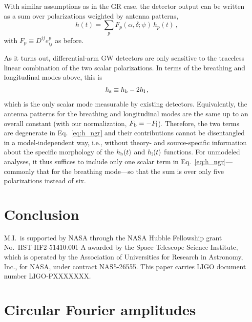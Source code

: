 \documentclass[aps,prd,twocolumn,superscriptaddress,preprintnumbers,floatfix,nofootinbib]{revtex4-2}
\newcommand{\beq}{\begin{equation}}
\newcommand{\eeq}{\end{equation}}
\newcommand{\dcc}{LIGO-PXXXXXXX}
\begin{document}
With similar assumptions as in the GR case, the detector output can be written as a sum over polarizations weighted by antenna patterns,
\beq \label{eq:h_ngr}
h(t) = \sum_p F_p(\alpha, \delta; \psi)\, h_p(t)\, ,
\eeq
with $F_p \equiv D^{ij} e^p_{ij}$ as before. 

As it turns out, differential-arm GW detectors are only sensitive to the traceless linear combination of the two scalar polarizations.
In terms of the breathing and longitudinal modes above, this is
\beq
h_{\rm s} \equiv \hb - 2\hlon\, ,
\eeq
which is the only scalar mode measurable by existing detectors.
Equivalently, the antenna patterns for the breathing and longitudinal modes are the same up to an overall constant (with our normalization, $F_{{\rm b}} = -F_{{\rm l}}$).
Therefore, the two terms are degenerate in Eq.~\eqref{eq:h_ngr} and their contributions cannot be disentangled in a model-independent way, i.e., without theory- and source-specific information about the specific morphology of the $h_{{\rm b}}(t)$ and $h_{{\rm l}}(t)$ functions.
For unmodeled analyses, it thus suffices to include only one scalar term in Eq.~\eqref{eq:h_ngr}---commonly that for the breathing mode---so that the sum is over only five polarizations instead of six.

\section{Conclusion}

\begin{acknowledgments}
M.I.\ is supported by NASA through the NASA Hubble Fellowship
grant No.\ HST-HF2-51410.001-A awarded by the Space Telescope
Science Institute, which is operated by the Association of Universities
for Research in Astronomy, Inc., for NASA, under contract NAS5-26555.
This paper carries LIGO document number \dcc{}.
\end{acknowledgments}

\appendix

\section{Circular Fourier amplitudes}
\label{app:circ}
\end{document}
